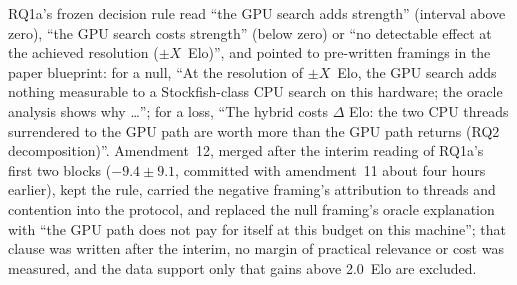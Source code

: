 \documentclass{article}
\begin{document}
RQ1a's frozen decision rule read ``the GPU search adds strength'' (interval above zero), ``the GPU search costs strength'' (below zero) or ``no detectable effect at the achieved resolution ($\pm X$~Elo)'', and pointed to pre-written framings in the paper blueprint: for a null, ``At the resolution of $\pm X$~Elo, the GPU search adds nothing measurable to a Stockfish-class CPU search on this hardware; the oracle analysis shows why \ldots''; for a loss, ``The hybrid costs $\Delta$ Elo: the two CPU threads surrendered to the GPU path are worth more than the GPU path returns (RQ2 decomposition)''. Amendment~12, merged after the interim reading of RQ1a's first two blocks ($-9.4 \pm 9.1$, committed with amendment~11 about four hours earlier), kept the rule, carried the negative framing's attribution to threads and contention into the protocol, and replaced the null framing's oracle explanation with ``the GPU path does not pay for itself at this budget on this machine''; that clause was written after the interim, no margin of practical relevance or cost was measured, and the data support only that gains above 2.0~Elo are excluded.
\end{document}
